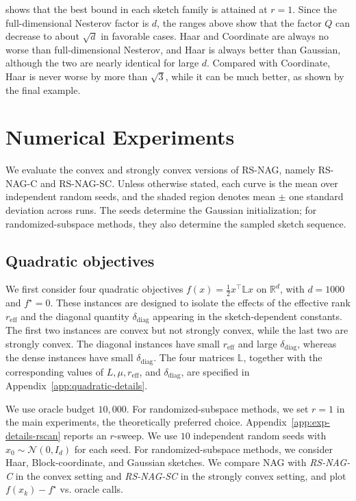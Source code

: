 \documentclass[10pt]{article}
\newcommand{\R}{\mathbb{R}}
\newcommand{\Lmat}{\mathbb{L}}
\begin{document}
 shows that the best bound in each sketch family is
attained at \(r=1\). Since the full-dimensional Nesterov factor is \(d\), the
ranges above show that the factor \(Q\) can decrease to about \(\sqrt d\) in
favorable cases. Haar and Coordinate are always no worse than full-dimensional
Nesterov, and
Haar is always better than Gaussian, although the two are nearly identical for
large \(d\). Compared with Coordinate, Haar is never worse by more than
\(\sqrt3\), 
while it can be much better, as shown by the final example.




\section{Numerical Experiments}
\label{sec:experiments}
We evaluate the convex and strongly convex versions of RS-NAG, namely
RS-NAG-C and RS-NAG-SC.
Unless otherwise stated, each curve is the mean over independent random seeds,
and the shaded region denotes mean \(\pm\) one standard deviation across runs.
The seeds determine the Gaussian initialization; for randomized-subspace
methods, they also determine the sampled sketch sequence.

\subsection{Quadratic objectives}
\label{subsec:quadratic}

We first consider four quadratic objectives \(f(x)=\frac12 x^\top \Lmat x\)
on \(\R^d\), with \(d=1000\) and \(f^\star=0\).
These instances are designed to isolate the
effects of the effective rank \(r_{\mathrm{eff}}\) and the diagonal quantity
\(\delta_{\mathrm{diag}}\) appearing in the sketch-dependent constants.
The first two instances are convex but not strongly convex, while the last two
are strongly convex. The diagonal instances have small \(r_{\mathrm{eff}}\) and
large \(\delta_{\mathrm{diag}}\), whereas the dense instances have small
\(\delta_{\mathrm{diag}}\). 
The four matrices \(\Lmat\), together with the corresponding values of
\(L,\mu,r_{\mathrm{eff}}\), and \(\delta_{\mathrm{diag}}\), are specified in
Appendix~\ref{app:quadratic-details}.

We use oracle budget \(10{,}000\).
For randomized-subspace methods, we set \(r=1\) in the main experiments, the
theoretically preferred choice.
Appendix~\ref{app:exp-details-rscan} reports an \(r\)-sweep.
We use \(10\) independent random seeds with
\(x_0\sim\mathcal N(0,I_d)\) for each seed.
For randomized-subspace methods, we consider Haar, Block-coordinate, and
Gaussian sketches. We compare NAG with \emph{RS-NAG-C} in the convex setting
and \emph{RS-NAG-SC} in the strongly convex setting, and plot
\(f(x_k)-f^\star\) vs. oracle calls.
\end{document}
